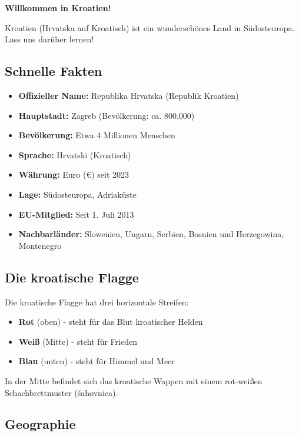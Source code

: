 \begin{culture}
\textbf{Willkommen in Kroatien!}

Kroatien (Hrvatska auf Kroatisch) ist ein wunderschönes Land in Südosteuropa. Lass uns darüber lernen!

\subsection*{Schnelle Fakten}

\begin{itemize}
    \item \textbf{Offizieller Name:} Republika Hrvatska (Republik Kroatien)
    \item \textbf{Hauptstadt:} Zagreb (Bevölkerung: ca. 800.000)
    \item \textbf{Bevölkerung:} Etwa 4 Millionen Menschen
    \item \textbf{Sprache:} Hrvatski (Kroatisch)
    \item \textbf{Währung:} Euro (€) seit 2023
    \item \textbf{Lage:} Südosteuropa, Adriaküste
    \item \textbf{EU-Mitglied:} Seit 1. Juli 2013
    \item \textbf{Nachbarländer:} Slowenien, Ungarn, Serbien, Bosnien und Herzegowina, Montenegro
\end{itemize}

\subsection*{Die kroatische Flagge}

Die kroatische Flagge hat drei horizontale Streifen:
\begin{itemize}
    \item \textcolor{croatianred}{\textbf{Rot}} (oben) - steht für das Blut kroatischer Helden
    \item \textbf{Weiß} (Mitte) - steht für Frieden
    \item \textcolor{croatianblue}{\textbf{Blau}} (unten) - steht für Himmel und Meer
\end{itemize}

In der Mitte befindet sich das kroatische Wappen mit einem rot-weißen Schachbrettmuster (šahovnica).

\subsection*{Geographie}


\end{culture}
